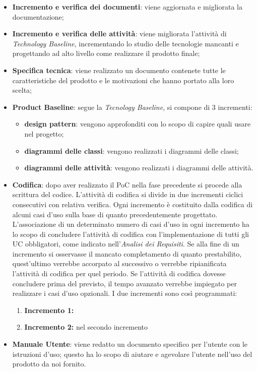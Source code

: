 \begin{itemize}
	\item \textbf{Incremento e verifica dei documenti}: viene aggiornata e migliorata la documentazione;
	\item \textbf{Incremento e verifica delle attività}: viene migliorata l’attività di \textit{Technology Baseline},  incrementando lo studio delle tecnologie mancanti e progettando ad alto livello come realizzare il prodotto finale;
	\item \textbf{Specifica tecnica}: viene realizzato un documento contenete tutte le caratteristiche del prodotto e le motivazioni che hanno portato alla loro scelta;
	\item \textbf{Product Baseline}: segue la \textit{Tecnology Baseline},  si compone di 3 incrementi:
		\begin{itemize}
			\item \textbf{design pattern}: vengono approfonditi con lo scopo di capire quali usare nel progetto;
			\item \textbf{diagrammi delle classi}: vengono realizzati i diagrammi delle classi;
			\item \textbf{diagrammi delle attività}: vengono realizzati i diagrammi delle attività.
		\end{itemize}
	\item \textbf{Codifica}: dopo aver realizzato il PoC nella fase precedente si procede alla scrittura del codice.  L'attività di codifica si divide in due incrementi ciclici consecutivi con relativa verifica.  Ogni incremento è costituito dalla codifica di alcuni casi d'uso sulla base di quanto precedentemente progettato.  L’associazione di un determinato numero di casi d’uso in ogni incremento ha lo scopo di concludere l'attività di codifica con l’implementazione di tutti gli UC obbligatori,  come indicato nell'\textit{Analisi dei Requisiti}.  Se alla fine di un incremento si osservasse il mancato completamento di quanto prestabilito,  quest’ultimo verrebbe accorpato al successivo o verrebbe ripianificata l’attività di codifica per quel periodo. Se l'attività di codifica dovesse concludere prima del previsto,  il tempo avanzato verrebbe impiegato per realizzare i casi d'uso opzionali.  I due incrementi sono così programmati:
		\begin{enumerate}
			\item \textbf{Incremento 1:} 
			\item \textbf{Incremento 2:} nel secondo incremento 
			
		\end{enumerate}
	\item \textbf{Manuale Utente}: viene redatto un documento specifico per l'utente con le istruzioni d'uso; questo ha lo scopo di aiutare e agevolare l’utente nell’uso del prodotto da noi fornito.
\end{itemize}

